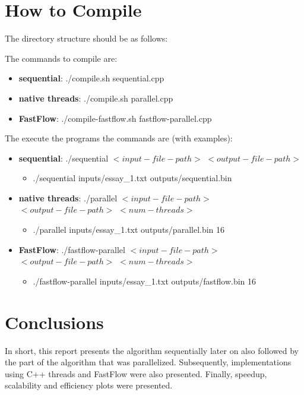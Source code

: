 \documentclass[12pt, letterpaper]{article}  %
\begin{document}
\section{How to Compile}

The directory structure should be as follows:

The commands to compile are:
\begin{itemize}
    \item \textbf{sequential}: ./compile.sh sequential.cpp
    \item \textbf{native threads}: ./compile.sh parallel.cpp
    \item \textbf{FastFlow}: ./compile-fastflow.sh fastflow-parallel.cpp
\end{itemize}
The execute the programs the commands are (with examples):
\begin{itemize}
    \item \textbf{sequential}: ./sequential $<input-file-path>$ $<output-file-path>$
    \begin{itemize}
        \item ./sequential inputs/essay\_1.txt outputs/sequential.bin
    \end{itemize}
    \item \textbf{native threads}: ./parallel $<input-file-path>$ $<output-file-path>$ $<num-threads>$
    \begin{itemize}
        \item ./parallel inputs/essay\_1.txt outputs/parallel.bin 16
    \end{itemize}
    \item \textbf{FastFlow}: ./fastflow-parallel $<input-file-path>$ $<output-file-path>$ $<num-threads>$
    \begin{itemize}
        \item ./fastflow-parallel inputs/essay\_1.txt outputs/fastflow.bin 16
    \end{itemize}
\end{itemize}

\section{Conclusions}
In short, this report presents the algorithm sequentially later on also followed by the part of the algorithm that was parallelized. Subsequently, implementations using C++ threads and FastFlow were also presented. Finally, speedup, scalability and efficiency plots were presented.
\end{document}
